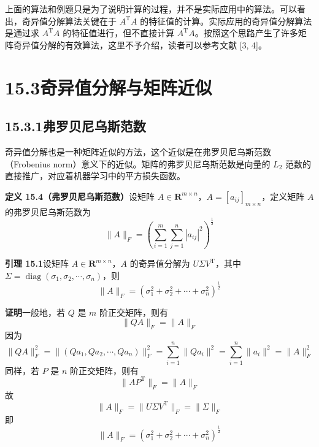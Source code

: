 \documentclass[UTF8,12pt,a4paper,fontset=fandol]{ctexart}
\begin{document}
上面的算法和例题只是为了说明计算的过程，并不是实际应用中的算法。可以看出，奇异值分解算法关键在于 $A^{\mathrm{T}}A$ 的特征值的计算。实际应用的奇异值分解算法是通过求 $A^{\mathrm{T}}A$ 的特征值进行，但不直接计算 $A^{\mathrm{T}}A$。按照这个思路产生了许多矩阵奇异值分解的有效算法，这里不予介绍，读者可以参考文献 [3, 4]。

\section*{15.3\quad 奇异值分解与矩阵近似}

\subsection*{15.3.1\quad 弗罗贝尼乌斯范数}

奇异值分解也是一种矩阵近似的方法，这个近似是在弗罗贝尼乌斯范数（Frobenius norm）意义下的近似。矩阵的弗罗贝尼乌斯范数是向量的 $L_2$ 范数的直接推广，对应着机器学习中的平方损失函数。

\noindent\textbf{定义 15.4（弗罗贝尼乌斯范数）}\quad 设矩阵 $A\in\mathbf{R}^{m\times n}$，$A=[a_{ij}]_{m\times n}$，定义矩阵 $A$ 的弗罗贝尼乌斯范数为
\begin{equation}
\|A\|_F=\left(\sum_{i=1}^m\sum_{j=1}^n |a_{ij}|^2\right)^{\frac12}
\tag{15.25}
\end{equation}

\noindent\textbf{引理 15.1}\quad 设矩阵 $A\in\mathbf{R}^{m\times n}$，$A$ 的奇异值分解为 $U\Sigma V^{\mathrm{T}}$，其中 $\Sigma=\operatorname{diag}(\sigma_1,\sigma_2,\cdots,\sigma_n)$，则
\begin{equation}
\|A\|_F=(\sigma_1^2+\sigma_2^2+\cdots+\sigma_n^2)^{\frac12}
\tag{15.26}
\end{equation}

\noindent\textbf{证明}\quad 一般地，若 $Q$ 是 $m$ 阶正交矩阵，则有
\begin{equation}
\|QA\|_F=\|A\|_F
\tag{15.27}
\end{equation}
因为
\[
\|QA\|_F^2=\|(Qa_1,Qa_2,\cdots,Qa_n)\|_F^2
=\sum_{i=1}^n\|Qa_i\|^2
=\sum_{i=1}^n\|a_i\|^2
=\|A\|_F^2
\]
同样，若 $P$ 是 $n$ 阶正交矩阵，则有
\begin{equation}
\|AP^{\mathrm{T}}\|_F=\|A\|_F
\tag{15.28}
\end{equation}
故
\begin{equation}
\|A\|_F=\|U\Sigma V^{\mathrm{T}}\|_F=\|\Sigma\|_F
\tag{15.29}
\end{equation}
即
\begin{equation}
\|A\|_F=(\sigma_1^2+\sigma_2^2+\cdots+\sigma_n^2)^{\frac12}
\tag{15.30}
\end{equation}
\end{document}
